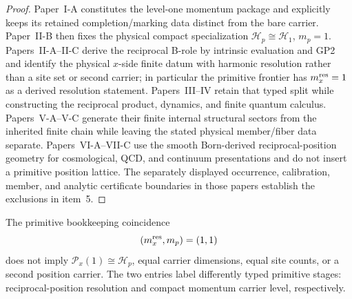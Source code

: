 \documentclass[12pt,a4paper]{article}
\begin{document}
\begin{proof}
Paper~I-A constitutes the level-one momentum package and explicitly keeps its
retained completion/marking data distinct from the bare carrier.  Paper~II-B
then fixes the physical compact specialization
\(\mathcal H_p\cong\mathcal H_1\), \(m_p=1\).  Papers~II-A--II-C derive the
reciprocal B-role by intrinsic evaluation and GP2 and identify the physical
\(x\)-side finite datum with harmonic resolution rather than a site set or
second carrier; in particular the primitive frontier has
\(m_x^{\rm res}=1\) as a derived resolution statement.  Papers~III--IV retain
that typed split while constructing the reciprocal product, dynamics, and
finite quantum calculus.  Papers~V-A--V-C generate their finite internal
structural sectors from the inherited finite chain while leaving the stated
physical member/fiber data separate.  Papers~VI-A--VII-C use the smooth
Born-derived reciprocal-position geometry for cosmological, QCD, and
continuum presentations and do not insert a primitive position lattice.
The separately displayed occurrence, calibration, member, and analytic
certificate boundaries in those papers establish the exclusions in item~5.
\end{proof}

\begin{corollary}
\label{p12:cor:no-equal-level-ontology}
The primitive bookkeeping coincidence
\[
   (m_x^{\rm res},m_p)=(1,1)
\]
does not imply
\(\mathcal P_x(1)\cong\mathcal H_p\), equal carrier dimensions, equal site
counts, or a second position carrier.  The two entries label differently
typed primitive stages: reciprocal-position resolution and compact momentum
carrier level, respectively.
\end{corollary}
\end{document}
